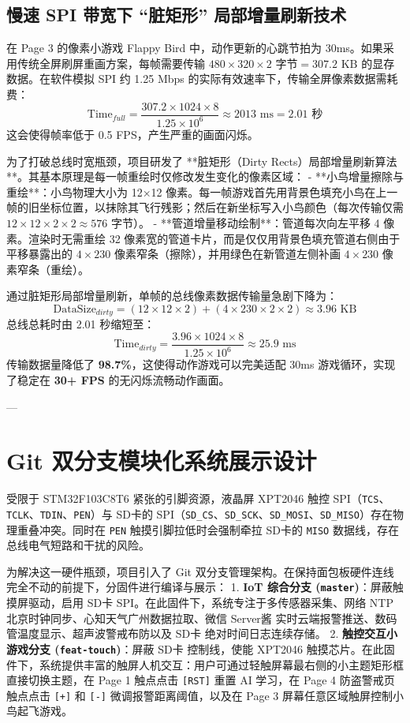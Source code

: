 \documentclass[11pt,a4paper]{ctexart}
\begin{document}
\subsection{慢速 SPI 带宽下 “脏矩形” 局部增量刷新技术}
在 Page 3 的像素小游戏 Flappy Bird 中，动作更新的心跳节拍为 30ms。如果采用传统全屏刷屏重画方案，每帧需要传输 $480 \times 320 \times 2\text{ 字节} = 307.2\text{ KB}$ 的显存数据。在软件模拟 SPI 约 1.25 Mbps 的实际有效速率下，传输全屏像素数据需耗费：
$$\text{Time}_{full} = \frac{307.2 \times 1024 \times 8}{1.25 \times 10^6} \approx 2013\text{ ms} = 2.01\text{ 秒}$$
这会使得帧率低于 0.5 FPS，产生严重的画面闪烁。

为了打破总线时宽瓶颈，项目研发了 **脏矩形（Dirty Rects）局部增量刷新算法**。其基本原理是每一帧重绘时仅修改发生变化的像素区域：
- **小鸟增量擦除与重绘**：小鸟物理大小为 12×12 像素。每一帧游戏首先用背景色填充小鸟在上一帧的旧坐标位置，以抹除其飞行残影；然后在新坐标写入小鸟颜色（每次传输仅需 $12 \times 12 \times 2 \times 2 \approx 576\text{ 字节}$）。
- **管道增量移动绘制**：管道每次向左平移 4 像素。渲染时无需重绘 32 像素宽的管道卡片，而是仅仅用背景色填充管道右侧由于平移暴露出的 $4 \times 230$ 像素窄条（擦除），并用绿色在新管道左侧补画 $4 \times 230$ 像素窄条（重绘）。

通过脏矩形局部增量刷新，单帧的总线像素数据传输量急剧下降为：
$$\text{DataSize}_{dirty} = (12 \times 12 \times 2) + (4 \times 230 \times 2 \times 2) \approx 3.96\text{ KB}$$
总线总耗时由 2.01 秒缩短至：
$$\text{Time}_{dirty} = \frac{3.96 \times 1024 \times 8}{1.25 \times 10^6} \approx 25.9\text{ ms}$$
传输数据量降低了 \textbf{98.7\%}，这使得动作游戏可以完美适配 30ms 游戏循环，实现了稳定在 \textbf{30+ FPS} 的无闪烁流畅动作画面。

---

\section{Git 双分支模块化系统展示设计}
受限于 STM32F103C8T6 紧张的引脚资源，液晶屏 XPT2046 触控 SPI（\texttt{TCS}、\texttt{TCLK}、\texttt{TDIN}、\texttt{PEN}）与 SD卡的 SPI（\texttt{SD\_CS}、\texttt{SD\_SCK}、\texttt{SD\_MOSI}、\texttt{SD\_MISO}）存在物理重叠冲突。同时在 \texttt{PEN} 触摸引脚拉低时会强制牵拉 SD卡的 \texttt{MISO} 数据线，存在总线电气短路和干扰的风险。

为解决这一硬件瓶颈，项目引入了 Git 双分支管理架构。在保持面包板硬件连线完全不动的前提下，分固件进行编译与展示：
1. \textbf{IoT 综合分支 (\texttt{master})}：屏蔽触摸屏驱动，启用 SD卡 SPI。在此固件下，系统专注于多传感器采集、网络 NTP 北京时钟同步、心知天气广州数据拉取、微信 Server酱 实时云端报警推送、数码管温度显示、超声波警戒布防以及 SD卡 绝对时间日志连续存储。
2. \textbf{触控交互小游戏分支 (\texttt{feat-touch})}：屏蔽 SD卡 控制线，使能 XPT2046 触摸芯片。在此固件下，系统提供丰富的触屏人机交互：用户可通过轻触屏幕最右侧的小主题矩形框直接切换主题，在 Page 1 触点点击 \texttt{[RST]} 重置 AI 学习，在 Page 4 防盗警戒页触点点击 \texttt{[+]} 和 \texttt{[-]} 微调报警距离阈值，以及在 Page 3 屏幕任意区域触屏控制小鸟起飞游戏。
\end{document}
